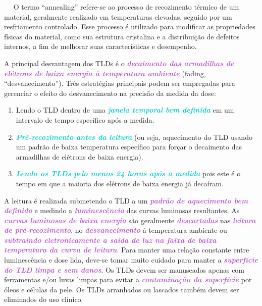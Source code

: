 \documentclass[11pt,a4paper]{article}
\begin{document}
	\begin{tcolorbox}[width=\textwidth, colback={white}, colbacktitle={DarkTurquoise!50!white}, title={$\bigstar$ \LobsterTwo{Nota:} $\bigstar $}, coltitle={CarnationPink}, colframe={DarkTurquoise}, fonttitle=\rmfamily\bfseries\Large]\label{exp:annealing}

		$\quad$ O termo ``annealing'' refere-se ao processo de recozimento térmico de um material, geralmente realizado em temperaturas elevadas, seguido por um resfriamento controlado. Esse processo é utilizado para modificar as propriedades físicas do material, como sua estrutura cristalina e a distribuição de defeitos internos, a fim de melhorar suas características e desempenho. 
	\end{tcolorbox}

	A principal desvantagem dos TLDs é o \textcolor{MediumOrchid}{\textbf{\textit{decaimento das armadilhas de elétrons de baixa energia à temperatura ambiente}}} (fading, ``desvanecimento''). Três estratégias principais podem ser empregadas para gerenciar o efeito do desvanecimento na precisão da medida da dose:

	\begin{enumerate}[label=\textcolor{CarnationPink}{\arabic*${}^\circ $}]
		\item Lendo o TLD dentro de uma \textcolor{DarkTurquoise}{\textbf{\textit{janela temporal bem definida}}} em um intervalo de tempo específico após a medida.
		\item \textcolor{DarkTurquoise}{\textbf{\textit{Pré-recozimento antes da leitura}}} (ou seja, aquecimento do TLD usando um padrão de baixa temperatura específico para forçar o decaimento das armadilhas de elétrons de baixa energia).
		\item \textcolor{DarkTurquoise}{\textbf{\textit{Lendo os TLDs pelo menos 24 horas após a medida}}} pois este é o tempo em que a maioria dos elétrons de baixa energia já decaíram.
	\end{enumerate}

	A leitura é realizada submetendo o TLD a um \textcolor{MediumOrchid}{\textbf{\textit{padrão de aquecimento bem definido}}} e medindo a \textcolor{MediumOrchid}{\textbf{\textit{luminescência}}} das curvas luminosas resultantes. As \textcolor{MediumOrchid}{\textbf{\textit{curvas luminosas de baixa energia}}} são geralmente \textcolor{MediumOrchid}{\textbf{\textit{descartadas}}} nas \textcolor{MediumOrchid}{\textbf{\textit{leitura de pré-recozimento}}}, no \textcolor{MediumOrchid}{\textbf{\textit{desvanecimento}}} à temperatura ambiente ou \textcolor{MediumOrchid}{\textbf{\textit{subtraindo eletronicamente a saída de luz na faixa de baixa temperatura da curva de leitura}}}. Para manter uma relação constante entre luminescência e dose lida, deve-se tomar muito cuidado para manter a \textcolor{MediumOrchid}{\textbf{\textit{superfície do TLD limpa e sem danos}}}. Os TLDs devem ser manuseados apenas com ferramentas e/ou luvas limpas para evitar a \textcolor{MediumOrchid}{\textbf{\textit{contaminação da superfície}}} por óleos e células da pele. Os TLDs arranhados ou lascados também devem ser eliminados do uso clínico.
\end{document}
